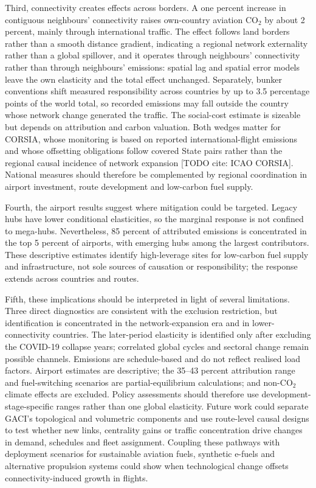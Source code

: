 \documentclass[12pt]{article}
\begin{document}
Third, connectivity creates effects across borders. A one percent increase in contiguous neighbours' connectivity raises own-country aviation CO$_2$ by about 2 percent, mainly through international traffic. The effect follows land borders rather than a smooth distance gradient, indicating a regional network externality rather than a global spillover, and it operates through neighbours' connectivity rather than through neighbours' emissions: spatial lag and spatial error models leave the own elasticity and the total effect unchanged. Separately, bunker conventions shift measured responsibility across countries by up to 3.5 percentage points of the world total, so recorded emissions may fall outside the country whose network change generated the traffic. The social-cost estimate is sizeable but depends on attribution and carbon valuation. Both wedges matter for CORSIA, whose monitoring is based on reported international-flight emissions and whose offsetting obligations follow covered State pairs rather than the regional causal incidence of network expansion [TODO cite: ICAO CORSIA]. National measures should therefore be complemented by regional coordination in airport investment, route development and low-carbon fuel supply.

Fourth, the airport results suggest where mitigation could be targeted. Legacy hubs have lower conditional elasticities, so the marginal response is not confined to mega-hubs. Nevertheless, 85 percent of attributed emissions is concentrated in the top 5 percent of airports, with emerging hubs among the largest contributors. These descriptive estimates identify high-leverage sites for low-carbon fuel supply and infrastructure, not sole sources of causation or responsibility; the response extends across countries and routes.

Fifth, these implications should be interpreted in light of several limitations. Three direct diagnostics are consistent with the exclusion restriction, but identification is concentrated in the network-expansion era and in lower-connectivity countries. The later-period elasticity is identified only after excluding the COVID-19 collapse years; correlated global cycles and sectoral change remain possible channels. Emissions are schedule-based and do not reflect realised load factors. Airport estimates are descriptive; the 35--43 percent attribution range and fuel-switching scenarios are partial-equilibrium calculations; and non-CO$_2$ climate effects are excluded. Policy assessments should therefore use development-stage-specific ranges rather than one global elasticity. Future work could separate GACI's topological and volumetric components and use route-level causal designs to test whether new links, centrality gains or traffic concentration drive changes in demand, schedules and fleet assignment. Coupling these pathways with deployment scenarios for sustainable aviation fuels, synthetic e-fuels and alternative propulsion systems could show when technological change offsets connectivity-induced growth in flights.
\end{document}
